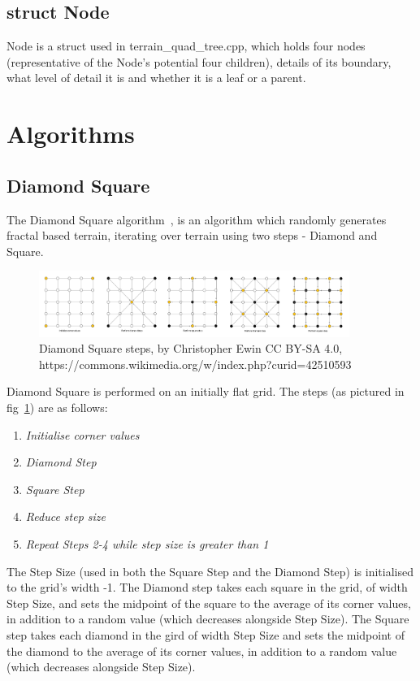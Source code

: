 \documentclass[a4paper,10pt]{report}
\begin{document}
\subsection{struct Node}
Node is a struct used in terrain\_quad\_tree.cpp, which holds four nodes (representative of the Node's potential four children), details of its boundary, what level of detail it is and whether it is a leaf or a parent.


\clearpage

\section{Algorithms}
\subsection{Diamond Square}
The Diamond Square algorithm~\cite{miller1986definition}, is an algorithm which randomly generates fractal based terrain, iterating over terrain using two steps - Diamond and Square. \medskip 

\begin{figure}[h!]
    \centering
  \includegraphics[width=0.9\textwidth]{Diamond_Square}
 \caption[Diamond Square steps, by Christopher Ewin]{Diamond Square steps, by Christopher Ewin CC BY-SA 4.0, https://commons.wikimedia.org/w/index.php?curid=42510593}
 \label{fig:diamond_square_steps}
\end{figure} 

Diamond Square is performed on an initially flat grid. The steps (as pictured in fig~\ref{fig:diamond_square_steps}) are as follows:

\begin{enumerate}
\item \textit{Initialise corner values}
\item \textit{Diamond Step}
\item \textit{Square Step}
\item \textit{Reduce step size} 
\item \textit{Repeat Steps 2-4 while step size is greater than 1}
\end{enumerate} 

The Step Size (used in both the Square Step and the Diamond Step) is initialised to the grid's width -1. The Diamond step takes each square in the grid, of width Step Size, and sets the midpoint of the square to the average of its corner values, in addition to a random value (which decreases alongside Step Size). The Square step takes each diamond in the gird of width Step Size and sets the midpoint of the diamond to the average of its corner values, in addition to a random value (which decreases alongside Step Size). \medskip
\end{document}
